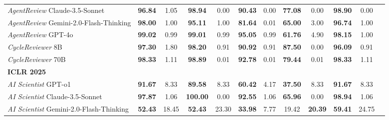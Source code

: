 \documentclass{article}
\begin{document}
\begin{table}[h]
{\begin{tabular}{lcccccccc|ccc}
\textit{AgentReview} Claude-3.5-Sonnet & \cellcolor[HTML]{F9EBE3}\textbf{96.84} & 1.05 & \cellcolor[HTML]{F9EBE3}\textbf{98.94} & 0.00 & \cellcolor[HTML]{F9EBE3}\textbf{90.43} & 0.00 & \cellcolor[HTML]{F9EBE3}\textbf{77.08} & 0.00 & \cellcolor[HTML]{F9EBE3}\textbf{98.90} & 0.00 \\
\textit{AgentReview} Gemini-2.0-Flash-Thinking & \cellcolor[HTML]{F9EBE3}\textbf{98.00} & 1.00 & \cellcolor[HTML]{F9EBE3}\textbf{95.11} & 1.00 & \cellcolor[HTML]{F9EBE3}\textbf{81.64} & 0.01 & \cellcolor[HTML]{F9EBE3}\textbf{65.00} & 3.00 & \cellcolor[HTML]{F9EBE3}\textbf{96.74} & 1.00 \\
\textit{AgentReview} GPT-4o & \cellcolor[HTML]{F9EBE3}\textbf{99.02} & 0.99 & \cellcolor[HTML]{F9EBE3}\textbf{99.01} & 0.99 & \cellcolor[HTML]{F9EBE3}\textbf{95.05} & 0.99 & \cellcolor[HTML]{F9EBE3}\textbf{61.76} & 4.90 & \cellcolor[HTML]{F9EBE3}\textbf{98.15} & 1.00 \\
\textit{CycleReviewer} 8B & \cellcolor[HTML]{F9EBE3}\textbf{97.30} & 1.80 & \cellcolor[HTML]{F9EBE3}\textbf{98.20} & 0.91 & \cellcolor[HTML]{F9EBE3}\textbf{90.92} & 0.91 & \cellcolor[HTML]{F9EBE3}\textbf{87.50} & 0.00 & \cellcolor[HTML]{F9EBE3}\textbf{96.09} & 0.91 \\
\textit{CycleReviewer} 70B & \cellcolor[HTML]{F9EBE3}\textbf{98.33} & 1.11 & \cellcolor[HTML]{F9EBE3}\textbf{98.89} & 0.01 & \cellcolor[HTML]{F9EBE3}\textbf{92.78} & 0.01 & \cellcolor[HTML]{F9EBE3}\textbf{79.44} & 0.01 & \cellcolor[HTML]{F9EBE3}\textbf{98.33} & 1.11 \\
\bottomrule
\textbf{ICLR 2025} & & & & & & & & & & \\
\textit{AI Scientist} GPT-o1 & \cellcolor[HTML]{F9EBE3}\textbf{91.67} & 8.33 & \cellcolor[HTML]{F9EBE3}\textbf{89.58} & 8.33 & \cellcolor[HTML]{F9EBE3}\textbf{60.42} & 4.17 & \cellcolor[HTML]{F9EBE3}\textbf{37.50} & 8.33 & \cellcolor[HTML]{F9EBE3}\textbf{91.67} & 8.33 \\
\textit{AI Scientist} Claude-3.5-Sonnet & \cellcolor[HTML]{F9EBE3}\textbf{97.87} & 1.06 & \cellcolor[HTML]{F9EBE3}\textbf{100.00} & 0.00 & \cellcolor[HTML]{F9EBE3}\textbf{92.55} & 1.06 & \cellcolor[HTML]{F9EBE3}\textbf{65.96} & 0.00 & \cellcolor[HTML]{F9EBE3}\textbf{98.94} & 1.06 \\
\textit{AI Scientist} Gemini-2.0-Flash-Thinking & \cellcolor[HTML]{F9EBE3}\textbf{52.43} & 18.45 & \cellcolor[HTML]{F9EBE3}\textbf{52.43} & 23.30 & \cellcolor[HTML]{F9EBE3}\textbf{33.98} & 7.77 & 19.42 & \cellcolor[HTML]{F9EBE3}\textbf{20.39} & \cellcolor[HTML]{F9EBE3}\textbf{59.41} & 24.75 \\


\end{tabular}}
\end{table}
\end{document}
